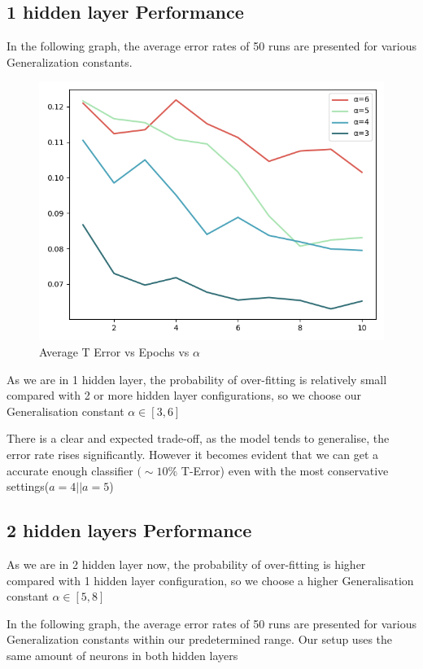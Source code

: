 \documentclass{proc}
\begin{document}
	\subsection{1 hidden layer Performance}
	In the following graph, the average error rates of 50 runs are presented for various Generalization constants.
	\begin{figure}[!h]
		\includegraphics[width=\linewidth]{genone.png}
		\caption{Average T Error vs Epochs vs $\alpha$}
		\label{fig:1-X-1}
	\end{figure}

	As we are in 1 hidden layer, the probability of over-fitting is relatively small compared with 2 or more hidden layer configurations, so we choose our Generalisation constant $\alpha \in [3,6]$
	
	There is a clear and expected trade-off, as the model tends to generalise, the error rate rises significantly.
	However it becomes evident that we can get a accurate enough classifier $(\sim 10\% $ T-Error) even with the most conservative settings(${a=4  || a=5}$)
	\subsection{2 hidden layers Performance}
	As we are in 2 hidden layer now, the probability of over-fitting is higher compared with 1 hidden layer configuration, so we choose a higher Generalisation constant  $\alpha \in [5,8]$
	
	In the following graph, the average error rates of 50 runs are presented for various Generalization constants within our predetermined range. Our setup uses the same amount of neurons in both hidden layers
	
\end{document}
